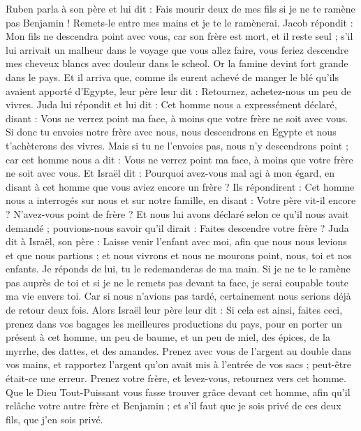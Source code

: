 \begin{multicols}{2}
Ruben parla à son père et lui dit : Fais mourir deux de mes fils si je ne te ramène pas Benjamin ! Remets-le entre mes mains et je te le ramènerai.
Jacob répondit : Mon fils ne descendra point avec vous, car son frère est mort, et il reste seul ; s'il lui arrivait un malheur dans le voyage que vous allez faire, vous feriez descendre mes cheveux blancs avec douleur dans le scheol.
\VerseOne{}Or la famine devint fort grande dans le pays.
Et il arriva que, comme ils eurent achevé de manger le blé qu'ils avaient apporté d'Egypte, leur père leur dit : Retournez, achetez-nous un peu de vivres.
Juda lui répondit et lui dit : Cet homme nous a expressément déclaré, disant : Vous ne verrez point ma face, à moins que votre frère ne soit avec vous.
Si donc tu envoies notre frère avec nous, nous descendrons en Egypte et nous t'achèterons des vivres.
Mais si tu ne l'envoies pas, nous n'y descendrons point ; car cet homme nous a dit : Vous ne verrez point ma face, à moins que votre frère ne soit avec vous.
Et Israël dit : Pourquoi avez-vous mal agi à mon égard, en disant à cet homme que vous aviez encore un frère ?
Ils répondirent : Cet homme nous a interrogés sur nous et sur notre famille, en disant : Votre père vit-il encore ? N'avez-vous point de frère ? Et nous lui avons déclaré selon ce qu'il nous avait demandé ; pouvions-nous savoir qu'il dirait : Faites descendre votre frère ?
Juda dit à Israël, son père : Laisse venir l'enfant avec moi, afin que nous nous levions et que nous partions ; et nous vivrons et nous ne mourons point, nous, toi et nos enfants.
Je réponds de lui, tu le redemanderas de ma main. Si je ne te le ramène pas auprès de toi et si je ne le remets pas devant ta face, je serai coupable toute ma vie envers toi.
Car si nous n'avions pas tardé, certainement nous serions déjà de retour deux fois.
Alors Israël leur père leur dit : Si cela est ainsi, faites ceci, prenez dans vos bagages les meilleures productions du pays, pour en porter un présent à cet homme, un peu de baume, et un peu de miel, des épices, de la myrrhe, des dattes, et des amandes.
Prenez avec vous de l'argent au double dans vos mains, et rapportez l'argent qu'on avait mis à l'entrée de vos sacs ; peut-être était-ce une erreur.
Prenez votre frère, et levez-vous, retournez vers cet homme.
Que le Dieu Tout-Puissant vous fasse trouver grâce devant cet homme, afin qu'il relâche votre autre frère et Benjamin ; et s'il faut que je sois privé de ces deux fils, que j'en sois privé.

\end{multicols}
